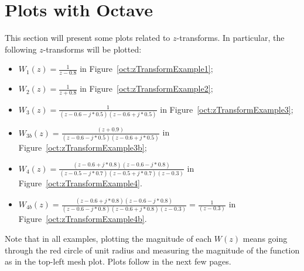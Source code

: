\documentclass[\documentfontsize, twocolumn]{\classname}
\begin{document}
\section{Plots with Octave}

This section will present some plots related to $z$-transforms. In particular, the following $z$-transforms will be plotted:
\begin{itemize}
    \item $W_1(z) = \frac{ 1 } {z - 0.8}$ in Figure~\ref{oct:zTransformExample1};
    \item $W_2(z) = \frac{ 1 } {z + 0.8}$ in Figure~\ref{oct:zTransformExample2};
    \item $W_3(z) = \frac{ 1 } {(z - 0.6 - j*0.5)(z - 0.6 + j*0.5)}$ in Figure~\ref{oct:zTransformExample3};
    \item $W_{3b}(z) = \frac{ (z + 0.9) } {(z - 0.6 - j*0.5)(z - 0.6 + j*0.5)}$ in Figure~\ref{oct:zTransformExample3b};
    \item $W_4(z) = \frac{ (z - 0.6 + j*0.8)(z - 0.6 - j*0.8) } {(z - 0.5 - j*0.7)(z - 0.5 + j*0.7)(z - 0.3)}$ in Figure~\ref{oct:zTransformExample4}.
    \item $W_{4b}(z) = \frac{ (z - 0.6 + j*0.8)(z - 0.6 - j*0.8) } {(z - 0.6 - j*0.8)(z - 0.6 + j*0.8)(z - 0.3)} = \frac { 1 } {(z - 0.3)}$ in Figure~\ref{oct:zTransformExample4b}.
\end{itemize}

Note that in all examples, plotting the magnitude of each $W(z)$ means going through the red circle of unit radius and measuring the magnitude of the function as in the top-left mesh plot. Plots follow in the next few pages.

\begin{figure*}[ht]
\begin{center}
\scalebox{0.6}{
    
    }\caption{Plot of $z$-Transform $W_1(z) = \frac{ 1 } {z - 0.8}$. In this sets of plots, it is visible how the pole determines a peak to infinity in the proximity of the point $(1,0)$, which is the starting point of our trip from $0$ to $2\pi$ following the unit circle in red. What happens is that our magnitude is first largely influenced by the pole---soon after, the magnitude goes quickly towards $0$ as we are going farther from the pole. Indeed, at $\pi$ we have the least magnitude, which is zero. Going from $\pi$ to $2\pi$ and approaching again the point $(1,0)$ in the z-plane, we have the exact opposite behavior: the magnitude now increases up to the original value.}\label{oct:zTransformExample1}
\end{center}
\end{figure*}
\end{document}
